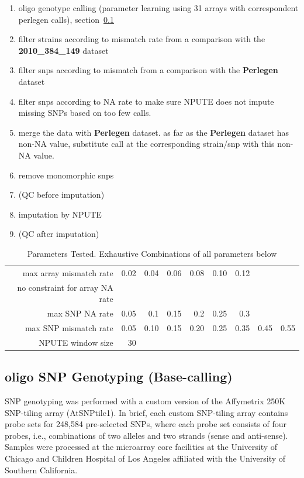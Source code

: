 \documentclass[a4paper,10pt]{article}
\begin{document}
\begin{enumerate}
 \item oligo genotype calling (parameter learning using 31 arrays with correspondent perlegen calls), section~\ref{oligo_calling}
 \item filter strains according to mismatch rate from a comparison with the \textbf{2010_384_149} dataset
 \item filter snps according to mismatch from a comparison with the \textbf{Perlegen} dataset
 \item filter snps according to NA rate to make sure NPUTE does not impute missing SNPs based on too few calls.
 \item merge the data with \textbf{Perlegen} dataset. as far as the \textbf{Perlegen} dataset has non-NA value,  substitute call at the corresponding strain/snp with this non-NA value.
 \item remove monomorphic snps
 \item (QC before imputation)
 \item imputation by NPUTE
 \item (QC after imputation)
\end{enumerate}
\begin{table}
\caption{Parameters Tested. Exhaustive Combinations of all parameters below}
\begin{tabular}{|r|r|r|r|r|r|r|r|r|}
\hline
max array mismatch rate & 0.02 & 0.04 & 0.06 & 0.08 & 0.10 & 0.12 \\
no constraint for array NA rate & & & & & \\

max SNP NA rate & 0.05 & 0.1 & 0.15 & 0.2 & 0.25 & 0.3 \\

max SNP mismatch rate & 0.05 & 0.10 & 0.15 & 0.20 & 0.25 & 0.35 & 0.45 & 0.55 \\

NPUTE window size & 30 \\
\hline
\end{tabular}
\end{table}

\subsection{oligo SNP Genotyping (Base-calling)}
\label{oligo_calling}
SNP genotyping was performed with a custom version of the Affymetrix 250K SNP-tiling array (AtSNPtile1).  In brief, each custom SNP-tiling array contains probe sets for 248,584 pre-selected SNPs, where each probe set consists of four probes, i.e., combinations of two alleles and two strands (sense and anti-sense). Samples were processed at the microarray core facilities at the University of Chicago and Children Hospital of Los Angeles affiliated with the University of Southern California.
\end{document}
